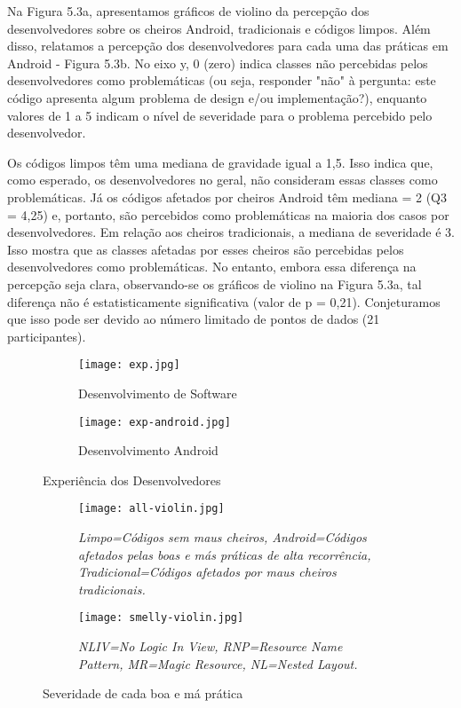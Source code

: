 Na Figura 5.3a, apresentamos gráficos de violino da percepção dos desenvolvedores sobre os cheiros Android, tradicionais e códigos limpos. Além disso, relatamos a percepção dos desenvolvedores para cada uma das práticas em Android - Figura 5.3b. No eixo y, 0 (zero) indica classes não percebidas pelos desenvolvedores como problemáticas (ou seja, responder "não" à pergunta: este código apresenta algum problema de design e/ou implementação?), enquanto valores de 1 a 5 indicam o nível de severidade para o problema percebido pelo desenvolvedor.

Os códigos limpos têm uma mediana de gravidade igual a 1,5. Isso indica que, como esperado, os desenvolvedores no geral, não consideram essas classes como problemáticas. Já os códigos afetados por cheiros Android têm mediana = 2 (Q3 = 4,25) e, portanto, são percebidos como problemáticas na maioria dos casos por desenvolvedores. Em relação aos cheiros tradicionais, a mediana de severidade é 3. Isso mostra que as classes afetadas por esses cheiros são percebidas pelos desenvolvedores como problemáticas. No entanto, embora essa diferença na percepção seja clara, observando-se os gráficos de violino na Figura 5.3a, tal diferença não é estatisticamente significativa (valor de p = 0,21). Conjeturamos que isso pode ser devido ao número limitado de pontos de dados (21 participantes).

\begin{figure*}
\centering
\begin{subfigure}{.5\textwidth}
  \centering
  \texttt{[image: exp.jpg]}
  \caption{Desenvolvimento de Software}
  \label{fig:sub1}
\end{subfigure}%
\begin{subfigure}{.5\textwidth}
  \centering
  \texttt{[image: exp-android.jpg]}
  \caption{Desenvolvimento Android}
  \label{fig:sub2}
\end{subfigure}
\caption{Experiência dos Desenvolvedores}
\label{fig:test}
\end{figure*}




\begin{figure*}
\centering
\begin{subfigure}{.4\textwidth}
  \centering
  \texttt{[image: all-violin.jpg]}
  \caption{\footnotesize{\textit{Limpo=Códigos sem maus cheiros, Android=Códigos afetados pelas boas e más práticas de alta recorrência, Tradicional=Códigos afetados por maus cheiros tradicionais.}}}
  \label{fig:sub2}
\end{subfigure}%
\hspace{5mm}
\begin{subfigure}{.4\textwidth}
  \centering
  \texttt{[image: smelly-violin.jpg]}
  \caption{\footnotesize{\textit{NLIV=No Logic In View, RNP=Resource Name Pattern, MR=Magic Resource, NL=Nested Layout.}}}
  \label{fig:sub1}
\end{subfigure}
\caption{Severidade de cada boa e má prática}
\label{fig:test}
\end{figure*}

